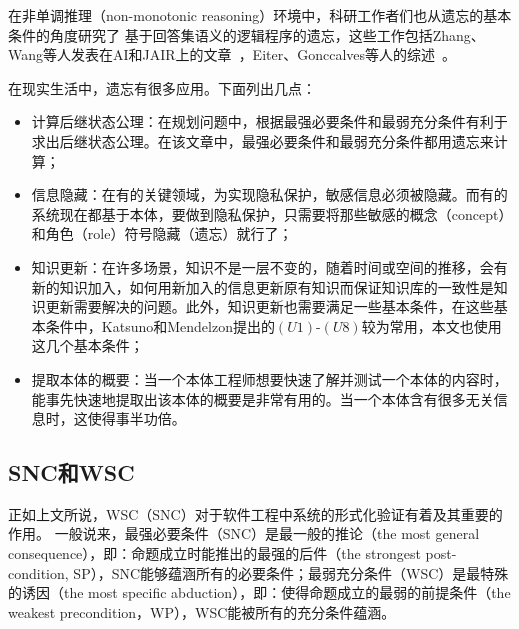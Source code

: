 
在非单调推理（non-monotonic reasoning）环境中，科研工作者们也从遗忘的基本条件的角度研究了
基于回答集语义的逻辑程序的遗忘，这些工作包括Zhang、Wang等人发表在AI和JAIR上的文章~\cite{DBLP:Zhang:AIJ2006,DBLP:journals/ai/EiterW08,Wong:PhD:Thesis,DBLP:journals/jair/WangZZZ14,wang2013forgetting,DBLP:journals/jair/Delgrande17,gonccalves2020limits}，Eiter、Gonccalves等人的综述~\cite{eiter2019brief,gonccalves2021forgetting}。


在现实生活中，遗忘有很多应用。下面列出几点：
\begin{itemize}
	\item 计算后继状态公理：在规划问题中，根据最强必要条件和最弱充分条件有利于求出后继状态公理\cite{DBLP:journals/jair/Lin03}。在该文章中，最强必要条件和最弱充分条件都用遗忘来计算；
	\item 信息隐藏：在有的关键领域，为实现隐私保护，敏感信息必须被隐藏。而有的系统现在都基于本体，要做到隐私保护，只需要将那些敏感的概念（concept）和角色（role）符号隐藏（遗忘）就行了；
	\item 知识更新：在许多场景，知识不是一层不变的，随着时间或空间的推移，会有新的知识加入，如何用新加入的信息更新原有知识而保证知识库的一致性是知识更新需要解决的问题。此外，知识更新也需要满足一些基本条件，在这些基本条件中，Katsuno和Mendelzon提出的$(U1)$-$(U8)$较为常用，本文也使用这几个基本条件；
	\item 提取本体的概要：当一个本体工程师想要快速了解并测试一个本体的内容时，能事先快速地提取出该本体的概要是非常有用的。当一个本体含有很多无关信息时，这使得事半功倍。
\end{itemize}







\subsection{SNC和WSC}


正如上文所说，WSC（SNC）对于软件工程中系统的形式化验证有着及其重要的作用。
一般说来，最强必要条件（SNC）是最一般的推论（the most general consequence），即：命题成立时能推出的最强的后件（the strongest post-condition, SP），SNC能够蕴涵所有的必要条件；最弱充分条件（WSC）是最特殊的诱因（the most specific abduction），即：使得命题成立的最弱的前提条件（the weakest precondition，WP），WSC能被所有的充分条件蕴涵。


